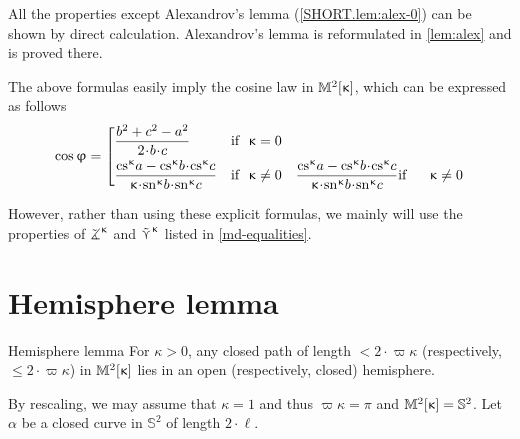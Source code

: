All the properties except Alexandrov's lemma (\ref{SHORT.lem:alex-0}) can be shown by direct calculation. Alexandrov's lemma is reformulated in \ref{lem:alex} and is proved there.




The above formulas easily imply  the cosine law in $\mathbb{M}_{{}}^{2}[{\upkappa}]$, which can be expressed as follows
\[\cos\phi
=\left[\begin{aligned}
&\frac{b^2+c^2-a^2}{2\cdot b\cdot c}
&\text{if}&\ \ \kappa=0
\\
&\frac{\cs\kappa a-\cs\kappa b\cdot\cs\kappa c}{\kappa\cdot\sn\kappa b\cdot\sn\kappa c}
&\text{if}&\ \ \kappa\not=0
&\frac{\cs\kappa a-\cs\kappa b\cdot\cs\kappa c}{\kappa\cdot\sn\kappa b\cdot\sn\kappa c}
&\text{if}&\ \ \kappa\not=0
\end{aligned}\right.\]

However, rather than using these explicit formulas,  we mainly will use
the properties of $\tangle\mc\kappa$ and $\mathop{\tilde\curlyvee}\nolimits^{\upkappa}$ listed in \ref{md-equalities}.

\section{Hemisphere lemma}\label{curves-in-model}





\begin{thm}{Hemisphere lemma}
\label{lem:hemisphere}
For $\kappa>0$, any closed path of length $<2\cdot \varpi\kappa$ (respectively, $\le2\cdot \varpi\kappa$) in $\mathbb{M}_{{}}^{2}[{\upkappa}]$ lies in an open (respectively, closed) hemisphere. 
\end{thm}

 By rescaling, we may assume that $\kappa=1$ and thus $\varpi\kappa=\pi$ and $\mathbb{M}_{{}}^{2}[{\upkappa}]=\mathbb{S}^2$.
Let $\alpha$ be a closed curve in $\mathbb{S}^2$ of length $2\cdot\ell$.

